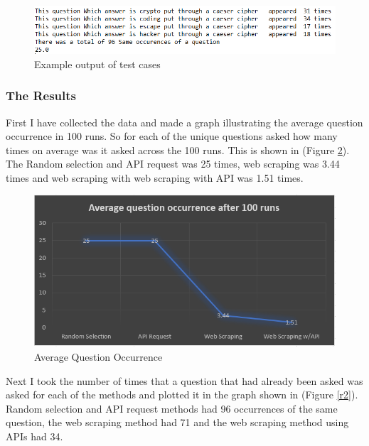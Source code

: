 \documentclass[12pt,a4paper]{article}
\begin{document}
\begin{figure}[h]
    \centering
    \includegraphics[width=1.0\textwidth]{Figs/exampleoutput1.PNG} 
    \caption{Example output of test cases} 
    \label{exout1}
\end{figure}  

\subsubsection{The Results} 
First I have collected the data and made a graph illustrating the average question occurrence in 100 runs. So for each of the unique questions asked how many times on average was it asked across the 100 runs. This is shown in (Figure \ref{r1}). The Random selection and API request was 25 times, web scraping was 3.44 times and web scraping with web scraping with API was 1.51 times.

\begin{figure}[h]
    \centering
    \includegraphics[width=1.0\textwidth]{Figs/results1.PNG} 
    \caption{Average Question Occurrence} 
    \label{r1}
\end{figure} 

Next I took the number of times that a question that had already been asked was asked for each of the methods and plotted it in the graph shown in (Figure \ref{r2}). Random selection and API request methods had 96 occurrences of the same question, the web scraping method had 71 and the web scraping method using APIs had 34.
\end{document}
